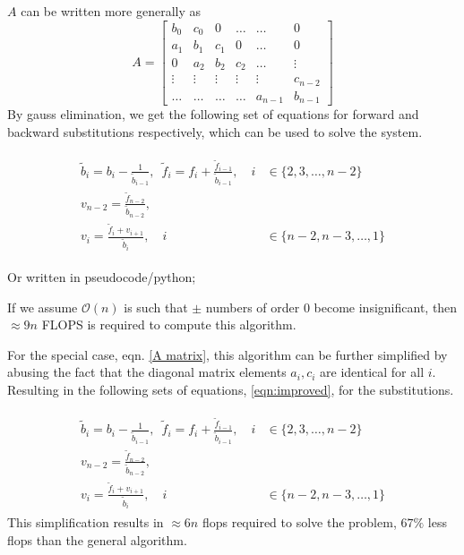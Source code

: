\documentclass[10pt,showpacs,preprintnumbers,footinbib,amsmath,amssymb,aps,prl,twocolumn,groupedaddress,superscriptaddress,showkeys]{revtex4-1}
\begin{document}
  $A$ can be written more generally as
  \begin{equation}
    \label{A matrix general}
    A = \left[ 
    \begin{matrix}
      b_0 & c_0 & 0 & \dots  & \dots &0 \\
      a_1 & b_1 & c_1 & 0 & \dots &  0 \\
      0 & a_2 & b_2 & c_2 & \dots & \vdots  \\
      \vdots & \vdots & \vdots & \vdots & \vdots & c_{n-2}\\
      \dots & \dots & \dots & \dots & a_{n-1} & b_{n-1}
    \end{matrix}
    \right]
  \end{equation}
  By gauss elimination, we get the following set of equations for forward and backward substitutions respectively, which can be used to solve the system.

    \begin{align}
    \begin{split}
      \label{eqn:general}
      \tilde b_i = b_i - \frac{1}{\tilde b_{i-1}}, 
      \enspace
      \tilde f_i = f_i + \frac{\tilde f_{i -1}}{\tilde b_{i-1}}, 
      \quad i &\in \{2, 3, \dots, n-2\} 
      \\
      v_{n-2} = \frac{\tilde f_{n-2}}{\tilde b_{n-2}}, &
      \\
      v_i = \frac{\tilde f_i + v_{i+1}}{\tilde b_i}, 
      \quad i &\in \{n-2, n-3, \dots, 1\}
    \end{split}
  \end{align}
  \newpage %

  Or written in pseudocode/python;
  

  If we assume $\mathcal O(n)$ is such that $\pm$ numbers of order 0 become insignificant, then $\approx 9n$ FLOPS is required to compute this algorithm.

  For the special case, eqn. \ref{A matrix}, this algorithm can be further simplified by abusing the fact that the diagonal matrix elements $a_i, c_i$ are identical for all $i$. Resulting in the following sets of equations, \ref{eqn:improved}, for the substitutions.

  \begin{align}
    \begin{split}
      \label{eqn:improved}
      \tilde b_i = b_i - \frac{1}{\tilde b_{i-1}}, 
      \enspace
      \tilde f_i = f_i + \frac{\tilde f_{i -1}}{\tilde b_{i-1}}, 
      \quad i &\in \{2, 3, \dots, n-2\} 
      \\
      v_{n-2} = \frac{\tilde f_{n-2}}{\tilde b_{n-2}}, &
      \\
      v_i = \frac{\tilde f_i + v_{i+1}}{\tilde b_i}, 
      \quad i &\in \{n-2, n-3, \dots, 1\}
    \end{split}
  \end{align}
  This simplification results in $\approx 6n$ flops required to solve the problem, $67\%$ less flops than the general algorithm.
\end{document}
